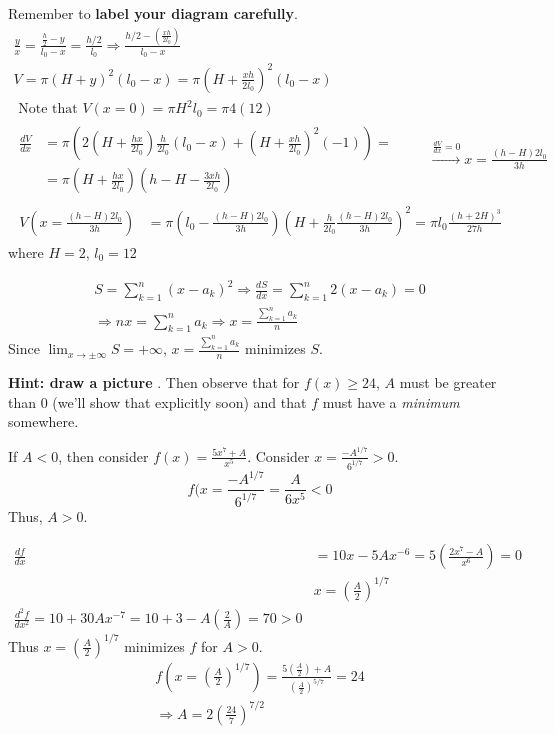 \documentclass[twoside]{amsart}
\theoremstyle{plain}
\theoremstyle{definition}
\newcommand{\exercisehead}[1]
  {\smallskip
   \noindent{\small\bf Exercise #1.}}
\begin{document}
Remember to \textbf{ label your diagram carefully}.  
\[
\begin{gathered}
  \frac{ y}{x} = \frac{ \frac{h}{2} - y }{ l_0 - x } = \frac{h/2}{l_0} \Longrightarrow \frac{ h/2 - \left( \frac{ xh}{2l_0} \right) }{ l_0 -x } \\
  V = \pi (H+y)^2 (l_0 - x) = \pi (H + \frac{xh}{2l_0} )^2 (l_0 - x)  \\
  \text{ Note that } V(x=0) = \pi H^2 l_0 = \pi 4 (12) \\
  \begin{aligned}
    \frac{dV}{dx} & = \pi ( 2 ( H + \frac{hx}{2l_0} ) \frac{h}{2l_0} ( l_0 - x ) + (H + \frac{xh}{2l_0} )^2 (-1) ) = \\
    & = \pi (H+\frac{hx}{2l_0} )( h - H - \frac{3xh}{2l_0} ) 
\end{aligned} \quad \quad \, 
\xrightarrow{ \frac{dV}{dx} = 0 } x = \frac{ (h-H)2l_0}{ 3 h } \\
\begin{aligned}
  V(x= \frac{ (h-H) 2 l_0 }{ 3h } ) & = \pi \left( l_0 - \frac{ (h-H)2l_0}{ 3h} \right)\left( H + \frac{ h}{2l_0} \frac{ (h-H) 2l_0 }{ 3h } \right)^2  = \boxed{ \pi l_0 \frac{ (h + 2H)^3 }{ 27 h } }
\end{aligned} 
\end{gathered}
\]
where $H =2$, $l_0 = 12$

\exercisehead{25} 
\[
\begin{gathered}
  S = \sum_{k=1}^n (x-a_k)^2 \Longrightarrow \frac{dS}{dx} = \sum_{k=1}^n 2 (x-a_k) = 0 \\
  \Longrightarrow nx = \sum_{k=1}^n a_k \Longrightarrow x = \frac{ \sum_{k=1}^n a_k }{ n}
\end{gathered}
\]
Since $\lim_{x \to \pm \infty } S = + \infty$, $x = \frac{ \sum_{k=1}^n a_k }{ n } $ minimizes $S$.  

\exercisehead{26} \textbf{ Hint: draw a picture }.  Then observe that for $f(x) \geq 24$, $A$ must be greater than $0$ (we'll show that explicitly soon) and that $f$ must have a \emph{ minimum } somewhere.  

If $A<0$, then consider $f(x) = \frac{ 5 x^7 + A}{ x^5}$.  Consider $x = \frac{ -A^{1/7}}{ 6^{1/7} } > 0 $.  
\[
f(x= \frac{ -A^{1/7}}{ 6^{1/7}} = \frac{ A}{6x^5} < 0 
\]
Thus, $A>0$.  

\[
\begin{aligned}
  \frac{df}{dx} &= 10x - 5A x^{-6} = 5 \left( \frac{ 2x^7 -A }{ x^6 } \right) = 0 \\
  & x = \left( \frac{A}{2} \right)^{1/7} \\
  \frac{d^2 f}{dx^2} = 10 + 30 Ax^{-7} = 10 + 3- A \left( \frac{2}{A} \right) = 70 > 0  
\end{aligned}
\]
Thus $x=\left( \frac{A}{2} \right)^{1/7}$ minimizes $f$ for $A>0$.  
\[
\begin{gathered}
  f(x= \left( \frac{A}{2} \right)^{1/7} ) = \frac{ 5 \left( \frac{A}{2} \right) + A }{ \left( \frac{A}{2} \right)^{5/7} } = 24 \\
  \Longrightarrow \boxed{ A = 2 \left( \frac{24}{7} \right)^{7/2} }
\end{gathered}
\]
\end{document}
